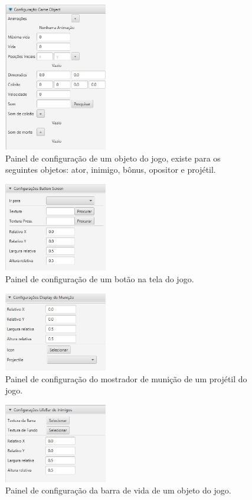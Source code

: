 \documentclass[12pt,twoside,openright,a4paper,english,brazil,sumario=tradicional]{abntex2}
\begin{document}
\begin{figure}[h]
\centering
\includegraphics[width=0.4\textwidth]{images/configurar-obj-1.jpg}
\caption{Painel de configuração de um objeto do jogo, existe para os seguintes objetos: ator, inimigo, bônus, opositor e projétil. }
\label{fig:configurar-obj-1}
\end{figure}
\begin{figure}[h]
\centering
\includegraphics[width=0.4\textwidth]{images/configurar-botao-1.jpg}
\caption{Painel de configuração de um botão na tela do jogo.}
\label{fig:configurar-botao-1}
\end{figure}
\begin{figure}[h]
\centering
\includegraphics[width=0.4\textwidth]{images/configurar-municao-1.jpg}
\caption{Painel de configuração do mostrador de munição de um projétil do jogo.}
\label{fig:configurar-municao-1}
\end{figure}
\begin{figure}[h]
\centering
\includegraphics[width=0.4\textwidth]{images/configurar-vida-1.jpg}
\caption{Painel de configuração da barra de vida de um objeto do jogo.}
\label{fig:configurar-vida-1}
\end{figure}
\end{document}
